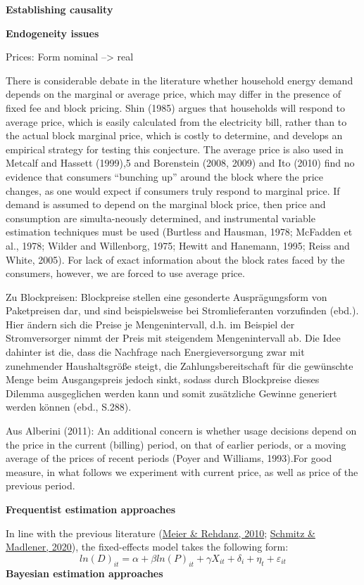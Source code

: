 \documentclass[12pt,twoside]{reedthesis}
\begin{document}
\textbf{Establishing causality}

\textbf{Endogeneity issues}

Prices: Form nominal --\textgreater{} real

There is considerable debate in the literature whether household energy demand depends on the marginal or average price, which may differ in the presence of fixed fee and block pricing. Shin (1985) argues that households will respond to average price, which is easily calculated from the electricity bill, rather than to the actual block marginal price, which is costly to determine, and develops an empirical strategy for testing this conjecture. The average price is also used in Metcalf and Hassett (1999),5 and Borenstein (2008, 2009) and Ito (2010) find no evidence that consumers ``bunching up'' around the block where the price changes, as one would expect if consumers truly respond to marginal price. If demand is assumed to depend on the marginal block price, then price and consumption are simulta-neously determined, and instrumental variable estimation techniques must be used (Burtless and Hausman, 1978; McFadden et al., 1978; Wilder and Willenborg, 1975; Hewitt and Hanemann, 1995; Reiss and White, 2005).
For lack of exact information about the block rates faced by the consumers, however, we are forced to use average price.

Zu Blockpreisen:
Blockpreise stellen eine gesonderte Ausprägungsform von Paketpreisen dar, und sind beispielsweise bei Stromlieferanten vorzufinden (ebd.). Hier ändern sich die Preise je Mengenintervall, d.h. im Beispiel der Stromversorger nimmt der Preis mit steigendem Mengenintervall ab. Die Idee dahinter ist die, dass die Nachfrage nach Energieversorgung zwar mit zunehmender Haushaltsgröße steigt, die Zahlungsbereitschaft für die gewünschte Menge beim Ausgangspreis jedoch sinkt, sodass durch Blockpreise dieses Dilemma ausgeglichen werden kann und somit zusätzliche Gewinne generiert werden können (ebd., S.288).

Aus Alberini (2011):
An additional concern is whether usage decisions depend on the price in the current (billing) period, on that of earlier periods, or a moving average of the prices of recent periods (Poyer and Williams, 1993).For good measure, in what follows we experiment with current price, as well as price of the previous period.

\textbf{Frequentist estimation approaches}

In line with the previous literature (\protect\hyperlink{ref-meier_rehdanz10}{Meier \& Rehdanz, 2010}; \protect\hyperlink{ref-schmitz_madlener20}{Schmitz \& Madlener, 2020}), the fixed-effects model takes the following form:
\begin{equation}
ln(D)_{it} = \alpha + \beta ln(P)_{it} + \gamma X_{it} + \delta_i + \eta_t + \varepsilon_{it}
\label{eq:fixedeff}
\end{equation}
\textbf{Bayesian estimation approaches}
\end{document}

